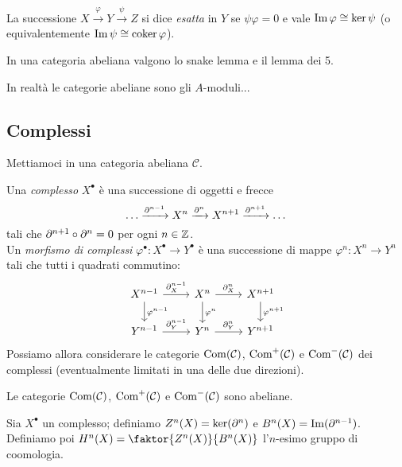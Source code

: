 \begin{definition}
    La successione $X\xrightarrow{\varphi} Y \xrightarrow{\psi} Z$ si dice \emph{esatta} in $Y$ se $\psi\varphi=0$ e vale $\operatorname{Im}\varphi\cong \ker\psi$ (o equivalentemente $\operatorname{Im}\psi\cong\operatorname{coker}\varphi$).
\end{definition}

\begin{proposition}
    In una categoria abeliana valgono lo snake lemma e il lemma dei 5.
\end{proposition}

\begin{theorem}
    In realtà le categorie abeliane sono gli $A$-moduli...
\end{theorem}

\subsection{Complessi}
Mettiamoci in una categoria abeliana $\mathcal{C}$.\\

\begin{definition}
    Una \emph{complesso} $X^\bullet$ è una successione di oggetti e frecce $$ \dots\xrightarrow{\partial^{n-1}} X^n \xrightarrow{\partial^{n}} X^{n+1} \xrightarrow{\partial^{n+1}}\dots $$
    tali che $\partial^{n+1}\circ\partial^n = 0$ per ogni $n\in\mathbb{Z}$.\\
    Un \emph{morfismo di complessi} $\varphi^\bullet:X^\bullet\to Y^\bullet$ è una successione di mappe $\varphi^n:X^n\to Y^n$ tali che tutti i quadrati commutino:
    $$\begin{tikzcd}
    X^{n-1} \ar[r,"\de_X^{n-1}"] \ar[d,"\varphi^{n-1}"] & X^{n} \ar[r,"\de_X^{n}"] \ar[d,"\varphi^{n}"] & X^{n+1} \ar[d,"\varphi^{n+1}"] \\
    Y^{n-1} \ar[r,"\de_Y^{n-1}"] & Y^{n} \ar[r,"\de_Y^{n}"] & Y^{n+1}
    \end{tikzcd}$$
    Possiamo allora considerare le categorie $\operatorname{Com}(\mathcal{C})$, $\operatorname{Com}^+(\mathcal{C})$ e $\operatorname{Com}^-(\mathcal{C})$ dei complessi (eventualmente limitati in una delle due direzioni).
\end{definition}

\begin{proposition}
    Le categorie $\operatorname{Com}(\mathcal{C})$, $\operatorname{Com}^+(\mathcal{C})$ e $\operatorname{Com}^-(\mathcal{C})$ sono abeliane.
\end{proposition}

\begin{definition}
    Sia $X^\bullet$ un complesso; definiamo $Z^n(X)=\ker(\partial^n)$ e $B^n(X)=\operatorname{Im}(\partial^{n-1})$. Definiamo poi $H^n(X)=\faktor{Z^n(X)}{B^n(X)}$ l'$n$-esimo gruppo di coomologia.
\end{definition}

